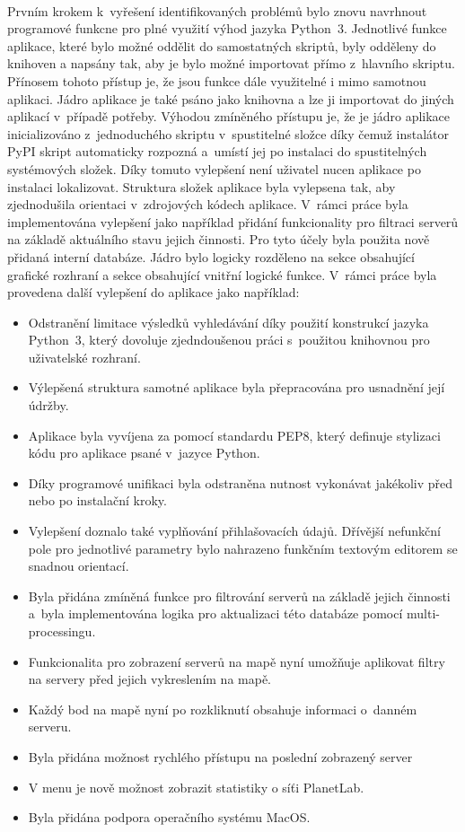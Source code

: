 \documentclass[%
  12pt,       				%
  a4paper,    				%
	unicode,						%
]{report}				    	%
\begin{document}
\paragraph{} Prvním krokem k~vyřešení identifikovaných problémů bylo znovu navrhnout programové funkcne pro plné využití výhod jazyka Python~3. Jednotlivé funkce aplikace, které bylo možné oddělit do samostatných skriptů, byly odděleny do knihoven a napsány tak, aby je bylo možné importovat přímo z~hlavního skriptu. Přínosem tohoto přístup je, že jsou funkce dále využitelné i mimo samotnou aplikaci. Jádro aplikace je také psáno jako knihovna a lze ji importovat do jiných aplikací v~případě potřeby. Výhodou zmíněného přístupu je, že je jádro aplikace inicializováno z~jednoduchého skriptu v~spustitelné složce díky čemuž instalátor PyPI skript automaticky rozpozná a~umístí jej po instalaci do spustitelných systémových složek. Díky tomuto vylepšení není uživatel nucen aplikace po instalaci lokalizovat. Struktura složek aplikace byla vylepsena tak, aby zjednodušila orientaci v~zdrojových kódech aplikace. V~rámci práce byla implementována vylepšení jako například přidání funkcionality pro filtraci serverů na základě aktuálního stavu jejich činnosti. Pro tyto účely byla použita nově přidaná interní databáze. Jádro bylo logicky rozděleno na sekce obsahující grafické rozhraní a sekce obsahující vnitřní logické funkce. V~rámci práce byla provedena další vylepšení do aplikace jako například:
\begin{itemize}
	\item Odstranění limitace výsledků vyhledávání díky použití konstrukcí jazyka Python~3, který dovoluje zjedndoušenou práci s~použitou knihovnou pro uživatelské rozhraní.
	\item Výlepšená struktura samotné aplikace byla přepracována pro usnadnění její údržby.
	\item Aplikace byla vyvíjena za pomocí standardu PEP8, který definuje stylizaci kódu pro aplikace psané v~jazyce Python. 
	\item Díky programové unifikaci byla odstraněna nutnost vykonávat jakékoliv před nebo po instalační kroky.
	\item Vylepšení doznalo také vyplňování přihlašovacích údajů. Dřívější nefunkční pole pro jednotlivé parametry bylo nahrazeno funkčním textovým editorem se snadnou orientací.
	\item Byla přidána zmíněná funkce pro filtrování serverů na základě jejich činnosti a~byla implementována logika pro aktualizaci této databáze pomocí multi-processingu.
	\item Funkcionalita pro zobrazení serverů na mapě nyní umožňuje aplikovat filtry na servery před jejich vykreslením na mapě.
	\item Každý bod na mapě nyní po rozkliknutí obsahuje informaci o~danném serveru.
	\item Byla přidána možnost rychlého přístupu na poslední zobrazený server
	\item V menu je nově možnost zobrazit statistiky o síťi PlanetLab.
	\item Byla přidána podpora operačního systému MacOS.
\end{itemize}
\end{document}
